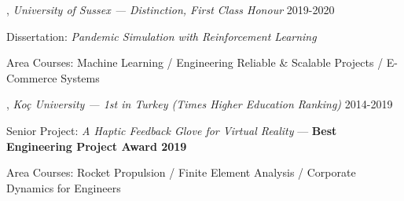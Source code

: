 
, \textit{University of Sussex — Distinction, First Class Honour}	\hfill 2019-2020
\begin{zitemize}
  \item Dissertation: \textit{Pandemic Simulation with Reinforcement Learning}
  \item Area Courses: Machine Learning \;/\; Engineering Reliable & Scalable Projects \;/\; E-Commerce Systems
\end{zitemize}

, \textit{ Koç University — 1st in Turkey (Times Higher Education Ranking)} \hfill	2014-2019
\begin{zitemize}
  \item Senior Project: \textit{A Haptic Feedback Glove for Virtual Reality} — \textbf{Best Engineering Project Award 2019}
  \item Area Courses: Rocket Propulsion \;/\; Finite Element Analysis \;/\; Corporate Dynamics for Engineers
\end{zitemize}

